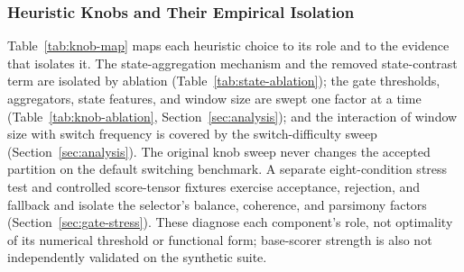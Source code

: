\documentclass[sigconf,anonymous]{acmart}
\begin{document}
\subsubsection{Heuristic Knobs and Their Empirical Isolation}
\label{sec:method-knobs}

Table~\ref{tab:knob-map} maps each heuristic choice to its role and to the evidence that isolates it.
The state-aggregation mechanism and the removed state-contrast term are isolated by ablation (Table~\ref{tab:state-ablation}); the gate thresholds, aggregators, state features, and window size are swept one factor at a time (Table~\ref{tab:knob-ablation}, Section~\ref{sec:analysis}); and the interaction of window size with switch frequency is covered by the switch-difficulty sweep (Section~\ref{sec:analysis}).
The original knob sweep never changes the accepted partition on the default switching benchmark. A separate eight-condition stress test and controlled score-tensor fixtures exercise acceptance, rejection, and fallback and isolate the selector's balance, coherence, and parsimony factors (Section~\ref{sec:gate-stress}). These diagnose each component's role, not optimality of its numerical threshold or functional form; base-scorer strength is also not independently validated on the synthetic suite.
\end{document}

